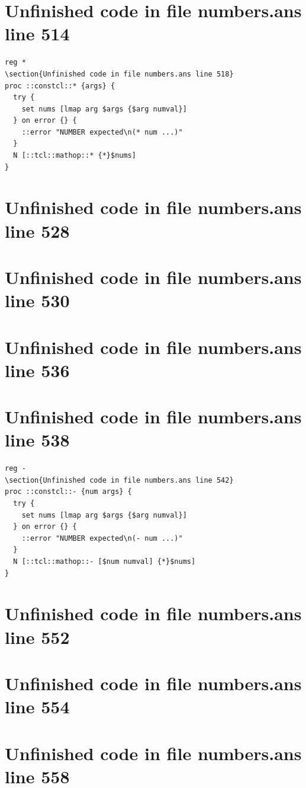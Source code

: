 \documentclass[twoside,9pt]{report}
\begin{document}
\section{Unfinished code in file numbers.ans line 514}
\index{*}
\begin{lstlisting}
reg *
\section{Unfinished code in file numbers.ans line 518}
proc ::constcl::* {args} {
  try {
    set nums [lmap arg $args {$arg numval}]
  } on error {} {
    ::error "NUMBER expected\n(* num ...)"
  }
  N [::tcl::mathop::* {*}$nums]
}
\end{lstlisting}
\section{Unfinished code in file numbers.ans line 528}
\section{Unfinished code in file numbers.ans line 530}
\section{Unfinished code in file numbers.ans line 536}
\section{Unfinished code in file numbers.ans line 538}
\index{-}
\begin{lstlisting}
reg -
\section{Unfinished code in file numbers.ans line 542}
proc ::constcl::- {num args} {
  try {
    set nums [lmap arg $args {$arg numval}]
  } on error {} {
    ::error "NUMBER expected\n(- num ...)"
  }
  N [::tcl::mathop::- [$num numval] {*}$nums]
}
\end{lstlisting}
\section{Unfinished code in file numbers.ans line 552}
\section{Unfinished code in file numbers.ans line 554}
\section{Unfinished code in file numbers.ans line 558}
\end{document}
